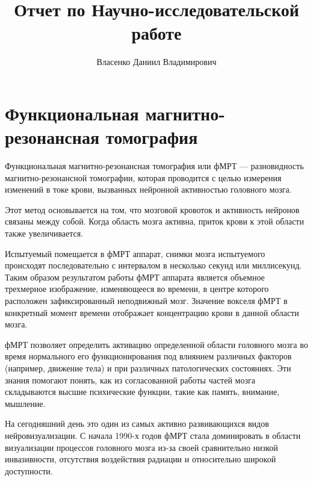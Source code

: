 \documentclass[specialist,
substylefile = spbu_report.rtx,
subf,href,colorlinks=true, 12pt]{disser}
\begin{document}
	
	\title{Отчет по Научно-исследовательской работе}	
	\author{Власенко Даниил Владимирович}
	\date{\number\year}	
	\maketitle
	\tableofcontents
	
	\intro
		\section{Функциональная магнитно-резонансная томография}
			Функциональная магнитно-резонансная томография или фМРТ — разновидность магнитно-резонансной томографии, которая проводится с целью измерения изменений в токе крови, вызванных нейронной активностью головного мозга. 
			
			Этот метод основывается на том, что мозговой кровоток и активность нейронов связаны между собой. Когда область мозга активна, приток крови к этой области также увеличивается. 
			
			Испытуемый помещается в фМРТ аппарат, снимки мозга испытуемого происходят последовательно с интервалом в несколько секунд или миллисекунд. Таким образом результатом работы фМРТ аппарата является объемное трехмерное изображение, изменяющееся во времени, в центре которого расположен зафиксированный неподвижный мозг. Значение вокселя фМРТ в конкретный момент времени отображает концентрацию крови в данной области мозга.
	
			фМРТ позволяет определить активацию определенной области головного мозга во время нормального его функционирования под влиянием различных факторов (например, движение тела) и при различных патологических состояниях. Эти знания помогают понять, как из согласованной работы частей мозга складываются высшие психические функции, такие как память, внимание, мышление. 
			
			На сегодняшний день это один из самых активно развивающихся видов нейровизуализации. С начала 1990-х годов фМРТ стала доминировать в области визуализации процессов головного мозга из-за своей сравнительно низкой инвазивности, отсутствия воздействия радиации и относительно широкой доступности.
			
\end{document}
